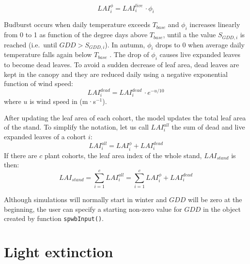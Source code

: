\documentclass[]{book}
\begin{document}
\begin{equation}
LAI_{i}^{\phi}=LAI^{live}_i\,\cdot\phi_i
\end{equation}

Budburst occurs when daily temperature exceeds \(T_{base}\) and \(\phi_i\) increases
linearly from 0 to 1 as function of the degree days above \(T_{base}\), until a the
value \(S_{GDD,i}\) is reached (i.e.~until \(GDD > S_{GDD,i}\)). In autumn, \(\phi_i\)
drops to 0 when average daily temperature falls again below \(T_{base}\) \citep{Sitch2003}. The drop of \(\phi_i\) causes live expanded leaves to become dead leaves. To avoid a sudden decrease of leaf area, dead leaves are kept in the canopy and they are reduced daily using a negative exponential function of wind speed:
\begin{equation}
LAI^{dead}_i=LAI^{dead}_i\,\cdot e^{- u/10}
\end{equation}
where \(u\) is wind speed in (m·s\(^{-1}\)).

After updating the leaf area of each cohort, the model updates the total leaf area of the stand. To simplify the notation, let us call \(LAI^{all}_{i}\) the sum of dead and live expanded leaves of a cohort \(i\):
\begin{equation}
LAI^{all}_{i} = LAI^{\phi}_{i}+LAI^{dead}_{i}
\end{equation}
If there are \(c\) plant cohorts, the leaf area index of the whole stand, \(LAI_{stand}\)
is then:
\begin{equation}
LAI_{stand} = \sum_{i=1}^c{LAI_{i}^{all}}= \sum_{i=1}^c{LAI^{\phi}_{i}+LAI^{dead}_{i}}
\end{equation}

Although simulations will normally start in winter and \(GDD\) will be zero at the beginning, the user can specify a starting non-zero value for \(GDD\) in the object created by function \texttt{spwbInput()}.

\hypertarget{light-extinction}{%
\section{Light extinction}\label{light-extinction}}
\end{document}
